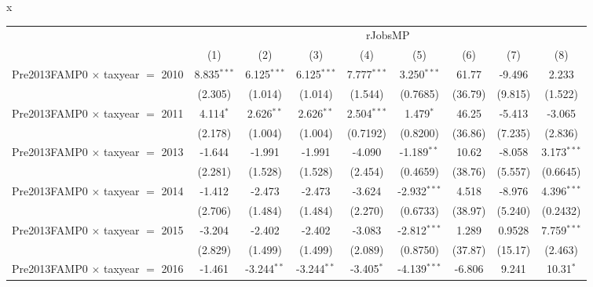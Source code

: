 x
\begingroup
\centering
\begin{tabular}{lcccccccc}
   \toprule
    & \multicolumn{8}{c}{rJobsMP}\\
                                           & (1)           & (2)            & (3)            & (4)            & (5)            & (6)           & (7)           & (8)\\  
   \midrule 
   Pre2013FAMP0 $\times$ taxyear $=$ 2010  & 8.835$^{***}$ & 6.125$^{***}$  & 6.125$^{***}$  & 7.777$^{***}$  & 3.250$^{***}$  & 61.77         & -9.496        & 2.233\\   
                                           & (2.305)       & (1.014)        & (1.014)        & (1.544)        & (0.7685)       & (36.79)       & (9.815)       & (1.522)\\   
   Pre2013FAMP0 $\times$ taxyear $=$ 2011  & 4.114$^{*}$   & 2.626$^{**}$   & 2.626$^{**}$   & 2.504$^{***}$  & 1.479$^{*}$    & 46.25         & -5.413        & -3.065\\   
                                           & (2.178)       & (1.004)        & (1.004)        & (0.7192)       & (0.8200)       & (36.86)       & (7.235)       & (2.836)\\   
   Pre2013FAMP0 $\times$ taxyear $=$ 2013  & -1.644        & -1.991         & -1.991         & -4.090         & -1.189$^{**}$  & 10.62         & -8.058        & 3.173$^{***}$\\   
                                           & (2.281)       & (1.528)        & (1.528)        & (2.454)        & (0.4659)       & (38.76)       & (5.557)       & (0.6645)\\   
   Pre2013FAMP0 $\times$ taxyear $=$ 2014  & -1.412        & -2.473         & -2.473         & -3.624         & -2.932$^{***}$ & 4.518         & -8.976        & 4.396$^{***}$\\   
                                           & (2.706)       & (1.484)        & (1.484)        & (2.270)        & (0.6733)       & (38.97)       & (5.240)       & (0.2432)\\   
   Pre2013FAMP0 $\times$ taxyear $=$ 2015  & -3.204        & -2.402         & -2.402         & -3.083         & -2.812$^{***}$ & 1.289         & 0.9528        & 7.759$^{***}$\\   
                                           & (2.829)       & (1.499)        & (1.499)        & (2.089)        & (0.8750)       & (37.87)       & (15.17)       & (2.463)\\   
   Pre2013FAMP0 $\times$ taxyear $=$ 2016  & -1.461        & -3.244$^{**}$  & -3.244$^{**}$  & -3.405$^{*}$   & -4.139$^{***}$ & -6.806        & 9.241         & 10.31$^{*}$\\   

\end{tabular}
